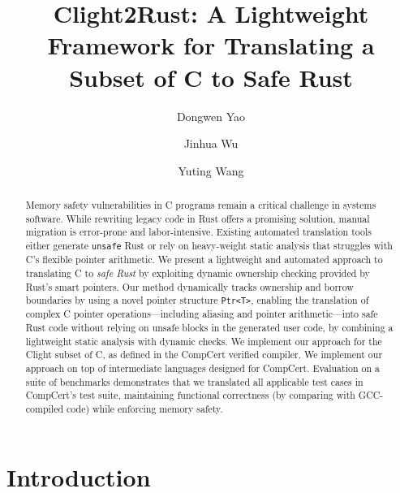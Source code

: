 \documentclass{llncs} %
\begin{document}
\title{Clight2Rust: A Lightweight Framework for Translating a Subset of C to Safe Rust}

\author{Dongwen Yao \and Jinhua Wu \and Yuting Wang%
}



\maketitle


\begin{abstract}
Memory safety vulnerabilities in C programs remain a critical challenge in systems software. While rewriting legacy code in Rust offers a promising solution, manual migration is error-prone and labor-intensive. Existing automated translation tools either generate \texttt{unsafe} Rust or rely on heavy-weight static analysis that struggles with C's flexible pointer arithmetic.
%
We present a lightweight and automated approach to translating C to \emph{safe Rust} by exploiting dynamic ownership checking provided by Rust's smart pointers.
%
Our method dynamically tracks ownership and borrow boundaries by using a novel pointer structure \texttt{Ptr<T>}, enabling the translation of complex C pointer operations---including aliasing and pointer arithmetic---into safe Rust code without relying on unsafe blocks in the generated user code, by combining a lightweight static analysis with dynamic checks. We implement our approach for the Clight subset of C, as defined in the CompCert verified compiler.
%
We implement our approach on top of intermediate languages designed for CompCert. Evaluation on a suite of benchmarks demonstrates that we translated all applicable test cases in CompCert's test suite, maintaining functional correctness (by comparing with GCC-compiled code) while enforcing memory safety.
%
\end{abstract}


\section{Introduction}
\label{sec:intro}
\end{document}
